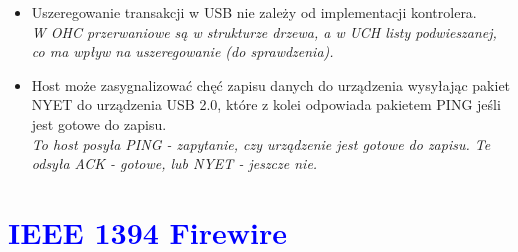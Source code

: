 \documentclass[a4paper,twoside]{article}
\begin{document}
\begin{itemize}
	\item \textcolor{nie}{Uszeregowanie transakcji w USB nie zależy od implementacji kontrolera.} \\
	{\small \emph{W OHC przerwaniowe są w strukturze drzewa, a w UCH listy podwieszanej, co ma wpływ na uszeregowanie (do sprawdzenia).}}
	
	\item \textcolor{nie}{Host może zasygnalizować chęć zapisu danych do urządzenia wysyłając pakiet NYET do urządzenia USB 2.0, które z kolei odpowiada pakietem PING jeśli jest gotowe do zapisu.} \\
	{\small \emph{To host posyła PING - zapytanie, czy urządzenie jest gotowe do zapisu. Te odsyła ACK - gotowe, lub NYET - jeszcze nie.}}
	
\end{itemize}

\section{\textcolor{blue}{IEEE 1394 Firewire}}
\end{document}
